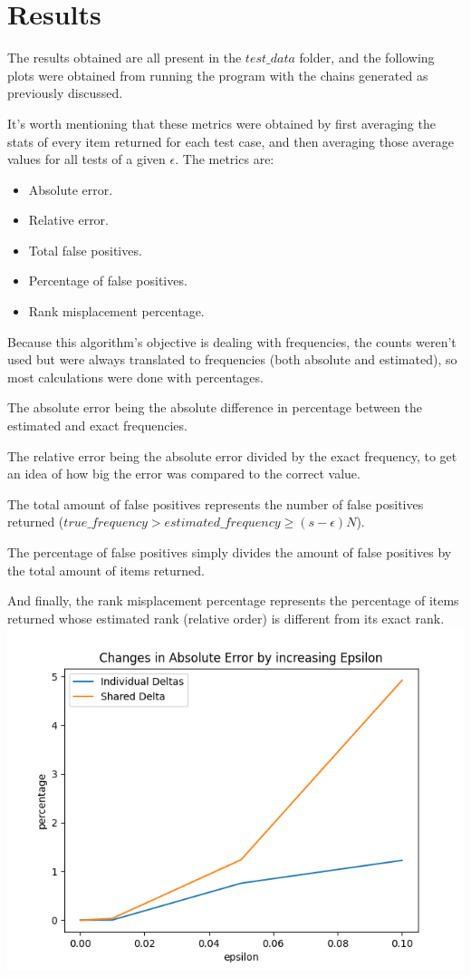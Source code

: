 \documentclass[...]{revdetua}
\begin{document}
\section{Results}
The results obtained are all present in the $test\_data$ folder, and the following plots were obtained from running the program with the chains generated as previously discussed.\par
It's worth mentioning that these metrics were obtained by first averaging the stats of every item returned for each test case, and then averaging those average values for all tests of a given $\epsilon$.
The metrics are:
\begin{itemize}
\item Absolute error.
\item Relative error.
\item Total false positives.
\item Percentage of false positives.
\item Rank misplacement percentage.
\end{itemize}
Because this algorithm's objective is dealing with frequencies, the counts weren't used but were always translated to frequencies (both absolute and estimated), so most calculations were done with percentages.\par
The absolute error being the absolute difference in percentage between the estimated and exact frequencies.\par
The relative error being the absolute error divided by the exact frequency, to get an idea of how big the error was compared to the correct value.\par
The total amount of false positives represents the number of false positives returned ($true\_frequency > estimated\_frequency \geq (s-\epsilon)N$).\par
The percentage of false positives simply divides the amount of false positives by the total amount of items returned.\par
And finally, the rank misplacement percentage represents the percentage of items returned whose estimated rank (relative order) is different from its exact rank.
\includegraphics[scale=0.5]{absolute.png}
\end{document}
